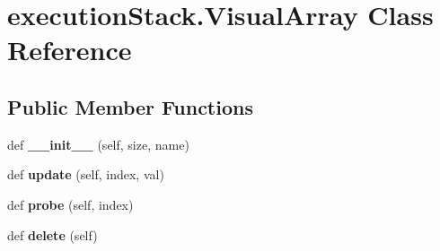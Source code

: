 \hypertarget{classexecution_stack_1_1_visual_array}{}\section{execution\+Stack.\+Visual\+Array Class Reference}
\label{classexecution_stack_1_1_visual_array}
\subsection*{Public Member Functions}
\begin{DoxyCompactItemize}
\item 
\mbox{\label{classexecution_stack_1_1_visual_array_ad98c3e54817417c582a6244b73aa7dff}} 
def {\bfseries \+\_\+\+\_\+init\+\_\+\+\_\+} (self, size, name)
\item 
\mbox{\label{classexecution_stack_1_1_visual_array_a627f6a007e0ba27e135794ffcd19ed5a}} 
def {\bfseries update} (self, index, val)
\item 
\mbox{\label{classexecution_stack_1_1_visual_array_adb38a0d313aa12b116095516798180f7}} 
def {\bfseries probe} (self, index)
\item 
\mbox{\label{classexecution_stack_1_1_visual_array_ae62023d197eed6af549d467433b755f2}} 
def {\bfseries delete} (self)
\end{DoxyCompactItemize}
